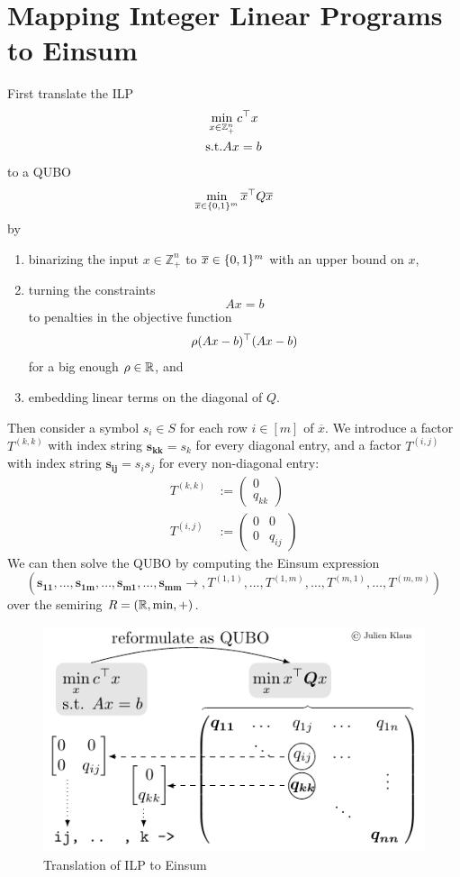 \chapter{Mapping Integer Linear Programs to Einsum}
\label{chap:appendix:map_ilp}

First translate the ILP
\begin{gather*}
    \min_{x \in \mathbb{Z}_+^n} c^\top x\\
    \text{s.t.} Ax = b
\end{gather*}
to a QUBO
$$\min_{\overline{x} \in \lbrace 0,1 \rbrace^m} \overline{x}^\top Q \overline{x}$$
by
\begin{enumerate}[label={\arabic*.}]
    \item binarizing the input $x \in \mathbb{Z}_+^n$ to $\overline{x} \in \lbrace 0,1 \rbrace^m$ with an upper bound on $x$,
    \item turning the constraints $$Ax = b$$ to penalties in the objective function $$\rho (Ax - b)^\top (Ax - b)$$ for a big enough $\rho \in \mathbb{R}$, and
    \item embedding linear terms on the diagonal of $Q$.
\end{enumerate}

Then consider a symbol $s_i \in S$ for each row $i \in [m]$ of $\overline{x}$.
We introduce a factor $T^{(k, k)}$ with index string $\bm{s_{kk}} = s_k$ for every diagonal entry, and a factor $T^{(i,j)}$ with index string $\bm{s_{ij}} = s_i s_j$ for every non-diagonal entry:
\begin{align*}
    T^{(k, k)} & := \begin{pmatrix}
        0 \\
        q_{kk}
    \end{pmatrix} \\
    T^{(i,j)}  & := \begin{pmatrix}
        0 & 0      \\
        0 & q_{ij}
    \end{pmatrix}
\end{align*}
We can then solve the QUBO by computing the Einsum expression
$$(\bm{s_{11}}, \dots, \bm{s_{1m}}, \dots, \bm{s_{m1}}, \dots, \bm{s_{mm}} \rightarrow, T^{(1,1)}, \dots, T^{(1,m)}, \dots, T^{(m,1)}, \dots, T^{(m, m)})$$
over the semiring $R = (\mathbb{R}, \min, +)$.

\begin{figure}[h]
    \centering
    \includegraphics{graphics/ilp.pdf}
    \caption{Translation of ILP to Einsum}
    \label{fig:appendix:map_ilp:ilp_to_einsum}
\end{figure}